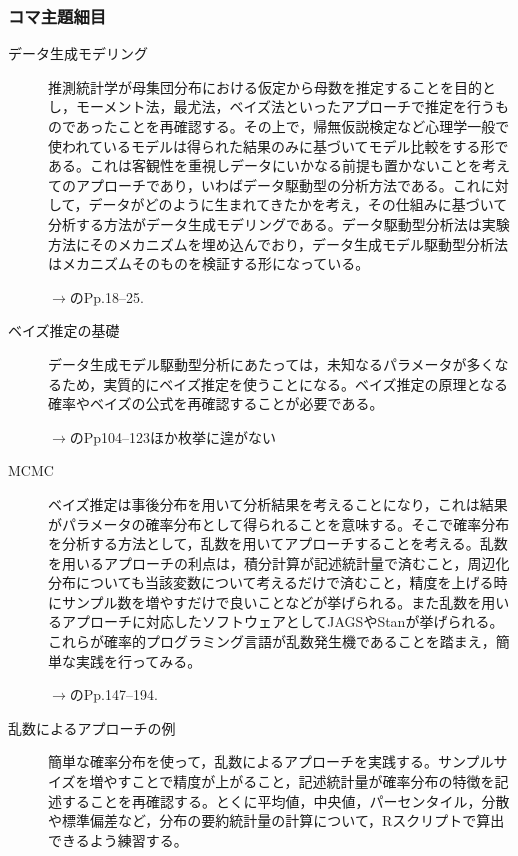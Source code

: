 \subsubsection{コマ主題細目}
\begin{description}
	\item[データ生成モデリング] 推測統計学が母集団分布における仮定から母数を推定することを目的とし，モーメント法，最尤法，ベイズ法といったアプローチで推定を行うものであったことを再確認する。その上で，帰無仮説検定など心理学一般で使われているモデルは得られた結果のみに基づいてモデル比較をする形である。これは客観性を重視しデータにいかなる前提も置かないことを考えてのアプローチであり，いわばデータ駆動型の分析方法である。これに対して，データがどのように生まれてきたかを考え，その仕組みに基づいて分析する方法がデータ生成モデリングである。データ駆動型分析法は実験方法にそのメカニズムを埋め込んでおり，データ生成モデル駆動型分析法はメカニズムそのものを検証する形になっている。

	      \begin{flushright}
		      $\to$\citet{Matsuura201610}のPp.18--25.
	      \end{flushright}

	\item[ベイズ推定の基礎] データ生成モデル駆動型分析にあたっては，未知なるパラメータが多くなるため，実質的にベイズ推定を使うことになる。ベイズ推定の原理となる確率やベイズの公式を再確認することが必要である。

	      \begin{flushright}
		      $\to$\citet{Maeda2017}のPp104--123ほか枚挙に遑がない
	      \end{flushright}

	\item[MCMC] ベイズ推定は事後分布を用いて分析結果を考えることになり，これは結果がパラメータの確率分布として得られることを意味する。そこで確率分布を分析する方法として，乱数を用いてアプローチすることを考える。乱数を用いるアプローチの利点は，積分計算が記述統計量で済むこと，周辺化分布についても当該変数について考えるだけで済むこと，精度を上げる時にサンプル数を増やすだけで良いことなどが挙げられる。また乱数を用いるアプローチに対応したソフトウェアとしてJAGSやStanが挙げられる。これらが確率的プログラミング言語が乱数発生機であることを踏まえ，簡単な実践を行ってみる。

	      \begin{flushright}
		      $\to$\citet{Maeda2017}のPp.147--194.
	      \end{flushright}

	\item[乱数によるアプローチの例]簡単な確率分布を使って，乱数によるアプローチを実践する。サンプルサイズを増やすことで精度が上がること，記述統計量が確率分布の特徴を記述することを再確認する。とくに平均値，中央値，パーセンタイル，分散や標準偏差など，分布の要約統計量の計算について，Rスクリプトで算出できるよう練習する。
\end{description}


